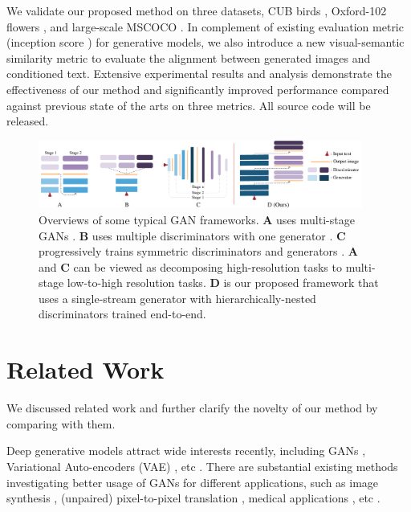 \documentclass[10pt,twocolumn,letterpaper]{article}
\begin{document}
We validate our proposed method on three datasets, CUB birds \cite{welinder2010caltech}, Oxford-102 flowers \cite{Nilsback08}, and large-scale MSCOCO \cite{lin2014microsoft}. In complement of existing evaluation metric (inception score \cite{improvedGAN}) for generative models, we also introduce a new visual-semantic similarity metric to evaluate the alignment between generated images and conditioned text. Extensive experimental results and analysis demonstrate the effectiveness of our method and significantly improved performance compared against previous state of the arts on three metrics. All source code will be released.


\begin{figure}[t]
	\centering
	\includegraphics[width=0.95\textwidth]{figure/views2.pdf}
	\vspace{-.2cm}
	\caption{Overviews of some typical GAN frameworks. \textbf{A} uses multi-stage GANs \cite{han2017stackgan,denton2015deep}. \textbf{B} uses multiple discriminators with one generator \cite{durugkar2016generative,tu_etal_nips17_d2gan}. \textbf{C} progressively trains symmetric discriminators and generators \cite{Karras2017progressive,huang2016stacked}. \textbf{A} and \textbf{C} can be viewed as decomposing high-resolution tasks to multi-stage low-to-high resolution tasks.  \textbf{D} is our proposed framework that uses a single-stream generator with hierarchically-nested discriminators trained end-to-end.} \label{fig:archs-review} \vspace{-.4cm}
\end{figure}


\section{Related Work}
We discussed related work and further clarify the novelty of our method by comparing with them.

Deep generative models attract wide interests recently, including GANs \cite{goodfellow2014generative}, Variational Auto-encoders (VAE) \cite{kingma2013auto}, etc \cite{oord2016pixel}. 
There are substantial existing methods investigating better usage of GANs for different applications, such as image synthesis \cite{radford2015unsupervised, shrivastava2016learning}, (unpaired) pixel-to-pixel translation \cite{isola2016image,zhu2017unpaired}, medical applications \cite{costa2017towards}, etc \cite{ledig2016photo,huang2016stacked}.
\end{document}
